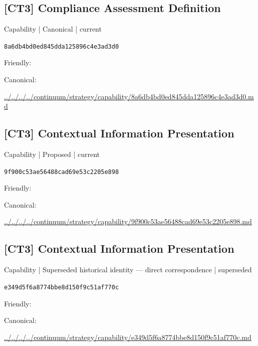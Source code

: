 \documentclass[10pt,a4paper]{article}
\begin{document}
\subsection*{[CT3] Compliance Assessment Definition}
{\small Capability | Canonical | current}\par
\texttt{8a6db4bd0ed845dda125896c4e3ad3d0}\par
Friendly: \par
Canonical: \par
{\footnotesize\url{../../../../continuum/strategy/capability/8a6db4bd0ed845dda125896c4e3ad3d0.md}}\par
\subsection*{[CT3] Contextual Information Presentation}
{\small Capability | Proposed | current}\par
\texttt{9f900c53ae56488cad69e53c2205e898}\par
Friendly: \par
Canonical: \par
{\footnotesize\url{../../../../continuum/strategy/capability/9f900c53ae56488cad69e53c2205e898.md}}\par
\subsection*{[CT3] Contextual Information Presentation}
{\small Capability | Superseded historical identity — direct correspondence | superseded}\par
\texttt{e349d5f6a8774bbe8d150f9c51af770c}\par
Friendly: \par
Canonical: \par
{\footnotesize\url{../../../../continuum/strategy/capability/e349d5f6a8774bbe8d150f9c51af770c.md}}\par
\end{document}
